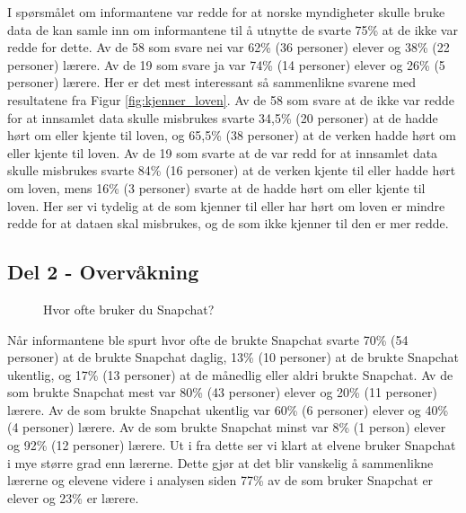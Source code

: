 I spørsmålet om informantene var redde for at norske myndigheter skulle bruke data de kan samle inn om informantene til å utnytte de svarte 75\% at de ikke var redde for dette. Av de 58 som svare nei var 62\% (36 personer) elever og 38\% (22 personer) lærere. Av de 19 som svare ja var 74\% (14 personer) elever og 26\% (5 personer) lærere. Her er det mest interessant så sammenlikne svarene med resultatene fra Figur \ref{fig:kjenner_loven}. Av de 58 som svare at de ikke var redde for at innsamlet data skulle misbrukes svarte 34,5\% (20 personer) at de hadde hørt om eller kjente til loven, og 65,5\% (38 personer) at de verken hadde hørt om eller kjente til loven. Av de 19 som svarte at de var redd for at innsamlet data skulle misbrukes svarte 84\% (16 personer) at de verken kjente til eller hadde hørt om loven, mens 16\% (3 personer) svarte at de hadde hørt om eller kjente til loven. Her ser vi tydelig at de som kjenner til eller har hørt om loven er mindre redde for at dataen skal misbrukes, og de som ikke kjenner til den er mer redde.

\subsection{Del 2 - Overvåkning}
\begin{figure}[H]
    \centering
    \caption{Hvor ofte bruker du Snapchat?}
\end{figure}
Når informantene ble spurt hvor ofte de brukte Snapchat svarte 70\% (54 personer) at de brukte Snapchat daglig, 13\% (10 personer) at de brukte Snapchat ukentlig, og 17\% (13 personer) at de månedlig eller aldri brukte Snapchat. Av de som brukte Snapchat mest var 80\% (43 personer) elever og 20\% (11 personer) lærere. Av de som brukte Snapchat ukentlig var 60\% (6 personer) elever og 40\% (4 personer) lærere. Av de som brukte Snapchat minst var 8\% (1 person) elever og 92\% (12 personer) lærere. Ut i fra dette ser vi klart at elvene bruker Snapchat i mye større grad enn lærerne. Dette gjør at det blir vanskelig å sammenlikne lærerne og elevene videre i analysen siden 77\% av de som bruker Snapchat er elever og 23\% er lærere.

